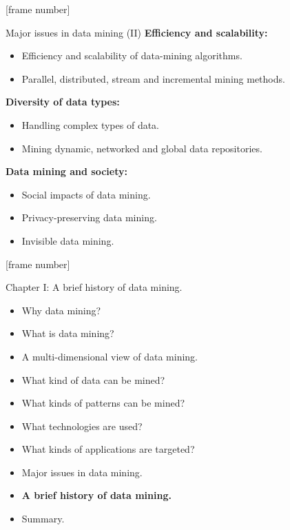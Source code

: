 \documentclass[aspectratio=169,t]{beamer}
\begin{document}
  {
    [frame number]
    \begin{frame}{Major issues in data mining (II)}
    \textbf{Efficiency and scalability:}\\
    \begin{itemize}
        \item Efficiency and scalability of data-mining algorithms.
        \item Parallel, distributed, stream and incremental mining methods.
    \end{itemize}
    \textbf{Diversity of data types:}\\
    \begin{itemize}
        \item Handling complex types of data.
        \item Mining dynamic, networked and global data repositories.
    \end{itemize}
    \textbf{Data mining and society:}\\
    \begin{itemize}
        \item Social impacts of data mining.
        \item Privacy-preserving data mining.
        \item Invisible data mining.
    \end{itemize}
    \end{frame}
  }


 {
    [frame number]
    \begin{frame}{Chapter I: A brief history of data mining.}
        \begin{itemize}
            \item Why data mining?
            \item What is data mining?
            \item A multi-dimensional view of data mining.
            \item What kind of data can be mined?
            \item What kinds of patterns can be mined?
            \item What technologies are used?
            \item What kinds of applications are targeted?
            \item Major issues in data mining.
            \item \textbf{A brief history of data mining.}
            \item Summary.
        \end{itemize}
    \end{frame}
  }
\end{document}
